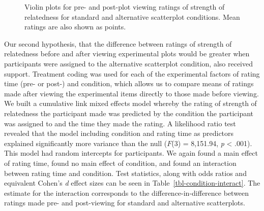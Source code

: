 \documentclass[manuscript,screen,review,anonymous]{acmart}
\begin{document}
\begin{figure}


\caption{\label{fig-descriptives}Violin plots for pre- and post-plot
viewing ratings of strength of relatedness for standard and alternative
scatterplot conditions. Mean ratings are also shown as points.}

\end{figure}%

Our second hypothesis, that the difference between ratings of strength
of relatedness before and after viewing experimental plots would be
greater when participants were assigned to the alternative scatterplot
condition, also received support. Treatment coding was used for each of
the experimental factors of rating time (pre- or post-) and condition,
which allows us to compare means of ratings made after viewing the
experimental items directly to those made before viewing. We built a
cumulative link mixed effects model whereby the rating of strength of
relatedness the participant made was predicted by the condition the
participant was assigned to and the time they made the rating. A
likelihood ratio test revealed that the model including condition and
rating time as predictors explained significantly more variance than the
null (\(F\)(3) = 8,151.94, \emph{p} \textless{} .001). This model had
random intercepts for participants. We again found a main effect of
rating time, found no main effect of condition, and found an interaction
between rating time and condition. Test statistics, along with odds
ratios and equivalent Cohen's \emph{d} effect sizes can be seen in
Table~\ref{tbl-condition-interact}. The estimate for the interaction
corresponds to the difference-in-difference between ratings made pre-
and post-viewing for standard and alternative scatterplots.
\end{document}
